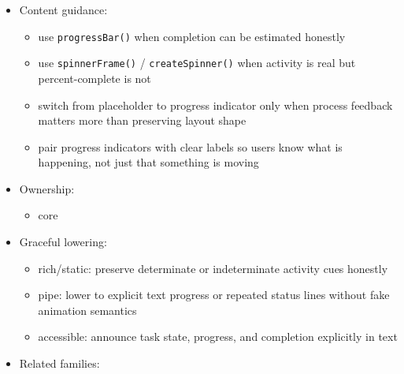 \begin{itemize}
  \begin{itemize}
  \tightlist
  \item
    loading is so brief that the indicator would flicker more than it helps
  \item
    the state should be explained as a durable message or result instead of transient activity
  \end{itemize}
\item
  Content guidance:

  \begin{itemize}
  \tightlist
  \item
    use \texttt{p\allowbreak{}r\allowbreak{}o\allowbreak{}g\allowbreak{}r\allowbreak{}e\allowbreak{}s\allowbreak{}s\allowbreak{}B\allowbreak{}a\allowbreak{}r\allowbreak{}(\allowbreak{})} when completion can be estimated honestly
  \item
    use \texttt{s\allowbreak{}p\allowbreak{}i\allowbreak{}n\allowbreak{}n\allowbreak{}e\allowbreak{}r\allowbreak{}F\allowbreak{}r\allowbreak{}a\allowbreak{}m\allowbreak{}e\allowbreak{}(\allowbreak{})} / \texttt{c\allowbreak{}r\allowbreak{}e\allowbreak{}a\allowbreak{}t\allowbreak{}e\allowbreak{}S\allowbreak{}p\allowbreak{}i\allowbreak{}n\allowbreak{}n\allowbreak{}e\allowbreak{}r\allowbreak{}(\allowbreak{})} when activity is real but percent-complete is not
  \item
    switch from placeholder to progress indicator only when process feedback matters more than preserving layout shape
  \item
    pair progress indicators with clear labels so users know what is happening, not just that something is moving
  \end{itemize}
\item
  Ownership:

  \begin{itemize}
  \tightlist
  \item
    core
  \end{itemize}
\item
  Graceful lowering:

  \begin{itemize}
  \tightlist
  \item
    rich/static: preserve determinate or indeterminate activity cues honestly
  \item
    pipe: lower to explicit text progress or repeated status lines without fake animation semantics
  \item
    accessible: announce task state, progress, and completion explicitly in text
  \end{itemize}
\item
  Related families:


\end{itemize}
